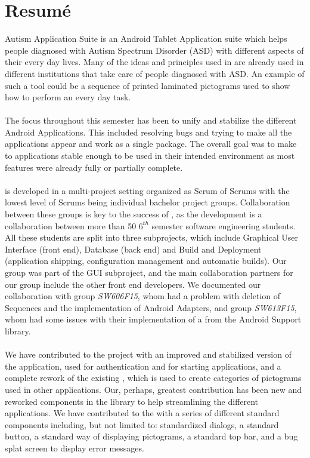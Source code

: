 \chapter{Resumé}
\giraf Autism Application Suite is an Android Tablet Application suite which helps people diagnosed with Autism Spectrum Disorder (ASD) with different aspects of their every day lives. Many of the ideas and principles used in \giraf are already used in different institutions that take care of people diagnosed with ASD. An example of such a tool could be a sequence of printed laminated pictograms used to show how to perform an every day task.
\\\\
The focus throughout this semester has been to unify and stabilize the different \giraf Android Applications. This included resolving bugs and trying to make all the applications appear and work as a single package. The overall goal was to make to applications stable enough to be used in their intended environment as most features were already fully or partially complete.  
\\\\
\giraf is developed in a multi-project setting organized as Scrum of Scrums with the lowest level of Scrums being individual bachelor project groups. Collaboration between these groups is key to the success of \giraf, as the development is a collaboration between more than 50 $6^{th}$ semester software engineering students. All these students are split into three subprojects, which include Graphical User Interface (front end), Database (back end) and Build and Deployment (application shipping, configuration management and automatic builds). Our group was part of the GUI subproject, and the main collaboration partners for our group include the other front end developers. We documented our collaboration with group \emph{SW606F15}, whom had a problem with deletion of \giraf Sequences and the implementation of Android Adapters, and group \emph{SW613F15}, whom had some issues with their implementation of a  from the Android Support library. 
\\\\
We have contributed to the project with an improved and stabilized version of the \giraf \launcher application, used for authentication and for starting \giraf applications, and a complete rework of the existing \giraf \ct, which is used to create categories of pictograms used in other applications. Our, perhaps, greatest contribution has been new and reworked components in the \gc library to help streamlining the different applications. We have contributed to the \gc with a series of different standard components including, but not limited to: standardized dialogs, a standard button, a standard way of displaying pictograms, a standard top bar, and a bug splat screen to display error messages.
